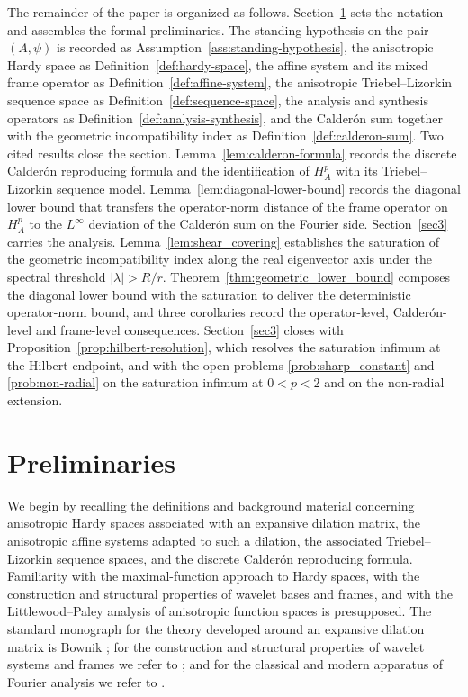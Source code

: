 \documentclass[pdflatex,sn-basic,Numbered]{sn-jnl}
\theoremstyle{thmstyleone}%
\theoremstyle{thmstylethree}%
\begin{document}
The remainder of the paper is organized as follows.
Section~\ref{sec2} sets the notation and assembles the formal
preliminaries. The standing hypothesis on the pair $(A, \psi)$ is
recorded as Assumption~\ref{ass:standing-hypothesis}, the anisotropic
Hardy space as Definition~\ref{def:hardy-space}, the affine system and
its mixed frame operator as Definition~\ref{def:affine-system}, the
anisotropic Triebel--Lizorkin sequence space as
Definition~\ref{def:sequence-space}, the analysis and synthesis
operators as Definition~\ref{def:analysis-synthesis}, and the Calder\'on
sum together with the geometric incompatibility index as
Definition~\ref{def:calderon-sum}. Two cited results
close the section. Lemma~\ref{lem:calderon-formula} records the
discrete Calder\'on reproducing formula and the identification of
$H^p_A$ with its Triebel--Lizorkin sequence model. Lemma~\ref{lem:diagonal-lower-bound}
records the diagonal lower bound that transfers the operator-norm
distance of the frame operator on $H^p_A$ to the $L^\infty$ deviation
of the Calder\'on sum on the Fourier side. Section~\ref{sec3} carries
the analysis. Lemma~\ref{lem:shear_covering} establishes the saturation
of the geometric incompatibility index along the real eigenvector axis
under the spectral threshold $|\lambda| > R / r$.
Theorem~\ref{thm:geometric_lower_bound} composes the diagonal lower
bound with the saturation to deliver the deterministic operator-norm
bound, and three corollaries record the operator-level, Calder\'on-level
and frame-level consequences. Section~\ref{sec3} closes with
Proposition~\ref{prop:hilbert-resolution}, which resolves the
saturation infimum at the Hilbert endpoint, and with the open problems
\ref{prob:sharp_constant} and \ref{prob:non-radial} on the saturation
infimum at $0 < p < 2$ and on the non-radial extension.

	\section{Preliminaries}\label{sec2}

We begin by recalling the definitions and background material concerning
anisotropic Hardy spaces associated with an expansive dilation matrix, the
anisotropic affine systems adapted to such a dilation, the associated
Triebel--Lizorkin sequence spaces, and the discrete Calder\'on reproducing
formula. Familiarity with the maximal-function approach to Hardy spaces, with
the construction and structural properties of wavelet bases and frames, and
with the Littlewood--Paley analysis of anisotropic function spaces is
presupposed. The standard monograph for the theory developed around an
expansive dilation matrix is Bownik \cite{Bownik2003}; for the construction and
structural properties of wavelet systems and frames we refer to
\cite{Daubechies1992, Christensen2016}; and for the classical and modern
apparatus of Fourier analysis we refer to \cite{Grafakos2014Classical,
	Grafakos2009Modern}.
\end{document}
